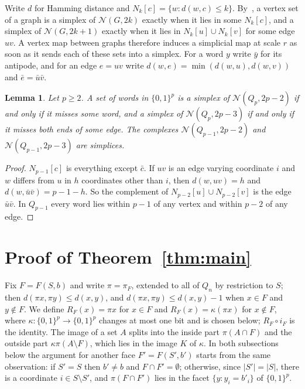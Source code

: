 \documentclass[11pt]{amsart}
\newtheorem{lemma}[theorem]{Lemma}
\theoremstyle{remark}
\newcommand{\N}{\mathcal{N}}
\newcommand{\cl}[2]{N_{#1}[#2]}
\begin{document}
Write $d$ for Hamming distance and $\cl k c=\{w:d(w,c)\le k\}$. By~\cite[Lemma~2.2]{ASS}, a vertex set of a graph is a
simplex of $\N(G,2k)$ exactly when it lies in some $\cl kc$, and a simplex of $\N(G,2k+1)$ exactly when it lies in
$\cl ku\cup\cl kv$ for some edge $uv$. A vertex map between graphs therefore induces a simplicial map at scale $r$ as
soon as it sends each of these sets into a simplex. For a word $y$ write $\bar y$ for its antipode, and for an edge
$e=uv$ write $d(w,e)=\min(d(w,u),d(w,v))$ and $\bar e=\bar u\bar v$.

\begin{lemma}\label{lem:targets}
Let $p\ge2$. A set of words in $\{0,1\}^p$ is a simplex of $\N(Q_p,2p-2)$ if and only if it misses some word, and a
simplex of $\N(Q_p,2p-3)$ if and only if it misses both ends of some edge. The complexes $\N(Q_{p-1},2p-2)$ and
$\N(Q_{p-1},2p-3)$ are simplices.
\end{lemma}

\begin{proof}
$\cl{p-1}c$ is everything except $\bar c$. If $uv$ is an edge varying coordinate $i$ and $w$ differs from $u$ in $h$
coordinates other than $i$, then $d(w,uv)=h$ and $d(w,\bar u\bar v)=p-1-h$. So the complement of $\cl{p-2}u\cup\cl{p-2}v$
is the edge $\bar u\bar v$. In $Q_{p-1}$ every word lies within $p-1$ of any vertex and within $p-2$ of any edge.
\end{proof}

\section{Proof of Theorem~\ref{thm:main}}

Fix $F=F(S,b)$ and write $\pi=\pi_F$, extended to all of $Q_n$ by restriction to $S$; then $d(\pi x,\pi y)\le d(x,y)$, and
$d(\pi x,\pi y)\le d(x,y)-1$ when $x\in F$ and $y\notin F$. We define $R_F(x)=\pi x$ for $x\in F$ and
$R_F(x)=\kappa(\pi x)$ for $x\notin F$, where $\kappa\colon\{0,1\}^p\to\{0,1\}^p$ changes at most one bit and is chosen
below; $R_F\circ i_F$ is the identity. The image of a set $A$ splits into the inside part $\pi(A\cap F)$ and the outside
part $\kappa\pi(A\setminus F)$, which lies in the image $K$ of $\kappa$. In both subsections below the argument for another face
$F'=F(S',b')$ starts from the same observation: if $S'=S$ then $b'\ne b$ and $F\cap F'=\emptyset$; otherwise, since
$|S'|=|S|$, there is a coordinate $i\in S\setminus S'$, and $\pi(F\cap F')$ lies in the facet $\{y:y_i=b'_i\}$ of $\{0,1\}^p$.
\end{document}
